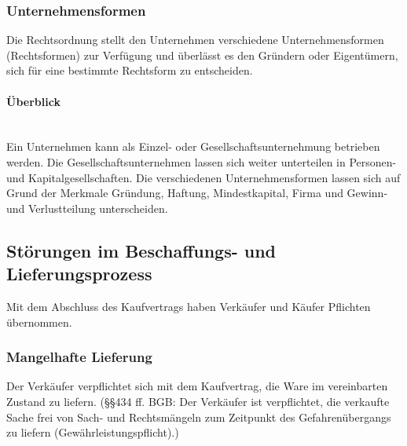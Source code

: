 \subsubsection{Unternehmensformen}
	Die Rechtsordnung stellt den Unternehmen verschiedene Unternehmensformen (Rechtsformen) zur Verfügung und überlässt es den Gründern oder Eigentümern, sich für eine bestimmte Rechtsform zu entscheiden.
	
\paragraph{Überblick}~\\
Ein Unternehmen kann als Einzel- oder Gesellschaftsunternehmung betrieben werden. Die Gesellschaftsunternehmen lassen sich weiter unterteilen in Personen- und Kapitalgesellschaften. Die verschiedenen Unternehmensformen lassen sich auf Grund der Merkmale Gründung, Haftung, Mindestkapital, Firma und Gewinn- und Verlustteilung unterscheiden.
	


\subsection{Störungen im Beschaffungs- und Lieferungsprozess}
Mit dem Abschluss des Kaufvertrags haben Verkäufer und Käufer Pflichten übernommen.

\subsubsection{Mangelhafte Lieferung}
Der Verkäufer verpflichtet sich mit dem Kaufvertrag, die Ware im vereinbarten Zustand zu liefern.  (§§434 ff. BGB: Der Verkäufer ist verpflichtet, die verkaufte Sache frei von Sach- und Rechtsmängeln zum Zeitpunkt des Gefahrenübergangs zu liefern (Gewährleistungspflicht).)


